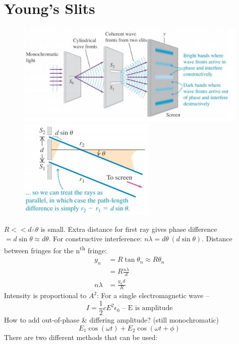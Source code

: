 \documentclass[a4paper, 11pt, normalem]{report}
\begin{document}
\section{Young's Slits}
\begin{figure}[H]
    \centering
    \includegraphics{Young1.jpg} 
    \includegraphics{Young2.jpg} 
\end{figure}
$R << d \therefore \theta$ is small.
Extra distance for first ray gives phase difference $= d\sin{\theta} \approx d\theta$.
For constructive interference: $n\lambda = d\theta~(d\sin{\theta})$.
Distance between fringes for the n\textsuperscript{th} fringe:
\begin{align}
    y_{n} &= R\tan{\theta_{n}} \approx R\theta_{n} \\
          &= R\frac{n\lambda}{d}\\
    n\lambda &= \frac{y_{n}d}{R}
\end{align}
Intensity is proportional to $A^{2}$:
For a single electromagnetic wave --
\begin{equation}
    I = \frac{1}{2}cE^{2}\epsilon_{0}\text{ -- E is amplitude}
\end{equation}
How to add out-of-phase \& differing amplitude? (still monochromatic)
\begin{equation}
    E_{1}\cos{(\omega t)} + E_{2}\cos{(\omega t + \phi)}
\end{equation}
There are two different methods that can be used: 
\end{document}
